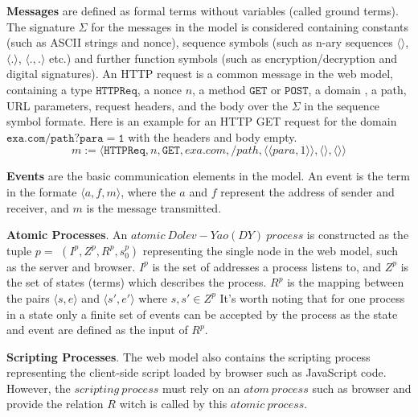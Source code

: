 \vspace{1mm}\noindent\textbf{Messages  } are defined as formal terms without variables (called ground terms). The signature $\Sigma$ for the messages in the model is considered containing constants (such as ASCII strings and nonce), sequence symbols (such as n-ary sequences $\langle \rangle$, $\langle . \rangle$, $\langle . ,. \rangle$ etc.) and further function symbols (such as encryption/decryption and digital signatures). An HTTP request is a common message in the web model, containing a type $\mathtt{HTTPReq}$, a nonce $n$, a method  $\mathtt{GET}$ or $\mathtt{POST}$,  a domain , a path, URL parameters, request headers, and the body  over the $\Sigma$ in the sequence symbol formate. Here is an example for an HTTP GET request for the domain  $\mathtt{exa.com/path?para=1}$ with the headers and body empty.
\begin{equation*}
    m:=\langle\mathtt{HTTPReq},n,\mathtt{GET},exa.com,/path,\langle \langle para, 1\rangle \rangle ,\langle \rangle,\langle \rangle \rangle
\end{equation*}

\vspace{1mm}\noindent\textbf{Events } are the basic communication elements in the model.  An event is the term in the formate $\langle a, f, m \rangle$, where the $a$ and $f$ represent the address of sender and receiver, and $m$ is the message transmitted. 

\vspace{1mm}\noindent\textbf{Atomic Processes}.  An $atomic\ Dolev-Yao (DY)\ process$ is constructed as the tuple $p=$ $(I^p, Z^p, R^p,s_0^p )$ representing the single  node in the web model, such as the server and browser. $I^p$ is the set of addresses a process listens to, and $Z^p$ is the set of states (terms) which describes the process. $R^p$ is the mapping between the pairs $\langle s, e \rangle$ and $\langle s', e' \rangle$ where $s, s' \in Z^p$
It's worth noting that for one process in a state only a finite set of events can be accepted by the process as the state and event are defined as the input of $R^p$.

\vspace{1mm}\noindent\textbf{Scripting Processes}. The web model also contains the scripting process representing the client-side script loaded by browser such as JavaScript code. However, the $scripting\ process$ must rely on an $atom\ process$ such as browser and provide the relation $R$ witch is called by this $atomic\ process$. 

